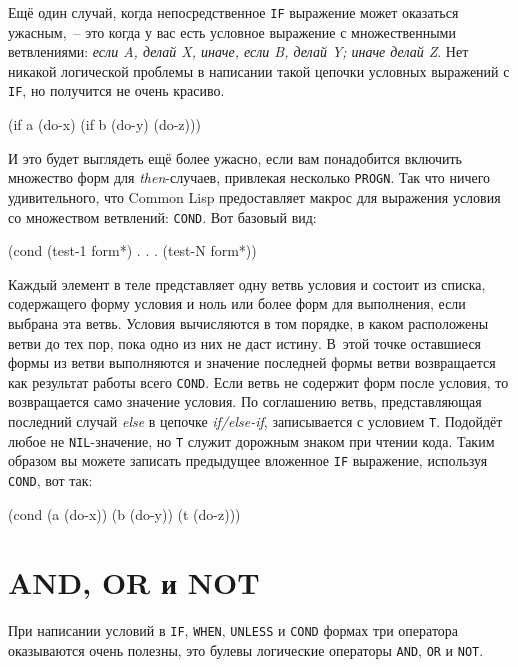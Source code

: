 Ещё один случай, когда непосредственное \lstinline{IF} выражение может оказаться ужасным,~-- это
когда у вас есть условное выражение с множественными ветвлениями: \textit{если A, делай X,
  иначе, если B, делай Y; иначе делай Z}. Нет никакой логической проблемы в написании
такой цепочки условных выражений с \lstinline{IF}, но получится не очень красиво.

\begin{myverb}
(if a
    (do-x)
    (if b
       (do-y)
       (do-z)))
\end{myverb}

И это будет выглядеть ещё более ужасно, если вам понадобится включить множество форм для
\textit{then}-случаев, привлекая несколько \lstinline{PROGN}. Так что ничего удивительного, что
Common Lisp предоставляет макрос для выражения условия со множеством ветвлений:
\lstinline{COND}. Вот базовый вид:

\begin{myverb}
(cond
  (test-1 form*)
      .
      .
      .
  (test-N form*))
\end{myverb}

Каждый элемент в теле представляет одну ветвь условия и состоит из списка, содержащего
форму условия и ноль или более форм для выполнения, если выбрана эта ветвь. Условия
вычисляются в том порядке, в каком расположены ветви до тех пор, пока одно из них не даст
истину. В~этой точке оставшиеся формы из ветви выполняются и значение последней формы
ветви возвращается как результат работы всего \lstinline{COND}. Если ветвь не содержит форм
после условия, то возвращается само значение условия. По соглашению ветвь, представляющая
последний случай \textit{else} в цепочке \textit{if/else-if}, записывается с условием
\lstinline{T}. Подойдёт любое не \lstinline{NIL}-значение, но \lstinline{T} служит дорожным знаком при
чтении кода. Таким образом вы можете записать предыдущее вложенное \lstinline{IF} выражение,
используя \lstinline{COND}, вот так:

\begin{myverb}
(cond (a (do-x))
      (b (do-y))
      (t (do-z)))
\end{myverb}

\section{AND, OR и NOT}


При написании условий в \lstinline{IF}, \lstinline{WHEN}, \lstinline{UNLESS} и \lstinline{COND} формах три
оператора оказываются очень полезны, это булевы логические операторы \lstinline{AND}, \lstinline{OR}
и \lstinline{NOT}.

